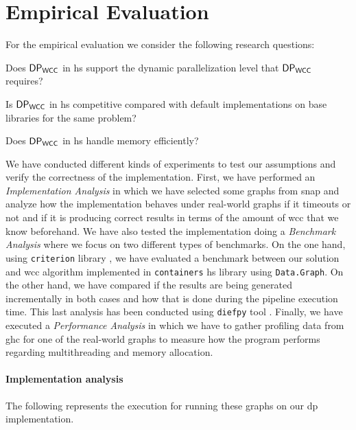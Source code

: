\clearpage

\section{Empirical Evaluation}
For the empirical evaluation we consider the following research questions: 
\begin{inparaenum}[\bf {\bf RQ}1\upshape)]
\label{res:question}
    \item Does $\mathsf{DP_{WCC}}$ in \acrshort{hs} support the dynamic parallelization level that $\mathsf{DP_{WCC}}$ requires?
    \item Is $\mathsf{DP_{WCC}}$ in \acrshort{hs} competitive compared with default implementations on base libraries for the same problem?
    \item Does $\mathsf{DP_{WCC}}$ in \acrshort{hs} handle memory efficiently?
\end{inparaenum}

We have conducted different kinds of experiments to test our assumptions and verify the correctness of the implementation.
First, we have performed an \emph{Implementation Analysis} in which we have selected some graphs from \acrfull{snap} \cite{stanford} 
and analyze how the implementation behaves under real-world graphs if it timeouts or not and if it is producing correct results in terms of the amount of \acrshort{wcc} that we know beforehand.
We have also tested the implementation doing a \emph{Benchmark Analysis} where we focus on two different types of benchmarks. On the one hand, 
using \texttt{criterion} library \cite{criterion}, we have evaluated a benchmark between our solution and \acrshort{wcc} algorithm implemented in \texttt{containers} \acrshort{hs} library \cite{containers} 
using \texttt{Data.Graph}. On the other hand, we have compared if the results are being generated incrementally in both cases and how that is done during the pipeline execution time. 
This last analysis has been conducted using \texttt{diefpy} tool \cite{diefpaper,diefpy}.
Finally, we have executed a \textit{Performance Analysis} in which we have to gather profiling data from \acrfull{ghc} for one of the real-world graphs to measure how the program performs regarding multithreading and memory allocation.

\paragraph{Implementation analysis} The following represents the execution for running these graphs on our \acrshort{dp} implementation.

